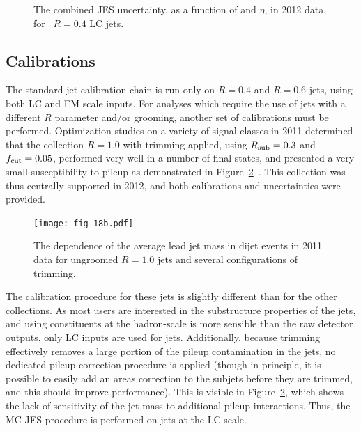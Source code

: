 
\begin{figure}
\centering
{}
\caption{The combined JES uncertainty, as a function of \pt and $\eta$, in 2012 data, for \antikt~$R=0.4$ LC jets.}
\label{fig:jet-reconstruction:combined_uncertainties}
\end{figure}



\subsection{\LargeR Calibrations}
\label{chapter:jet-reconstruction:larger}
The standard jet calibration chain is run only on $R=0.4$ and $R=0.6$ jets, using both LC and EM scale inputs. For analyses which require the use of jets with a different $R$ parameter and/or grooming, another set of calibrations must be performed. Optimization studies on a variety of signal classes in 2011 determined that the collection \antikt $R=1.0$ with trimming applied, using $R_{\rm sub} = 0.3$ and $f_{\rm cut} = 0.05$, performed very well in a number of final states, and presented a very small susceptibility to pileup as demonstrated in Figure~\ref{fig:jet-reconstruction:pileup_large}~\cite{ATLAS-SS-2011}. This collection was thus centrally supported in 2012, and both calibrations and uncertainties were provided.

\begin{figure}
\centering
\texttt{[image: fig\_18b.pdf]}
\caption{The dependence of the average lead jet mass in dijet events in 2011 data for ungroomed \antikt $R=1.0$ jets and several configurations of trimming.}
\label{fig:jet-reconstruction:pileup_large}
\end{figure}


The calibration procedure for these \largeR jets is slightly different than for the other collections. As most users are interested in the substructure properties of the jets, and using constituents at the hadron-scale is more sensible than the raw detector outputs, only LC inputs are used for \largeR jets. Additionally, because trimming effectively removes a large portion of the pileup contamination in the jets, no dedicated pileup correction procedure is applied (though in principle, it is possible to easily add an areas correction to the subjets before they are trimmed, and this should improve performance). This is visible in Figure~\ref{fig:jet-reconstruction:pileup_large}, which shows the lack of sensitivity of the jet mass to additional pileup interactions. Thus, the MC JES procedure is performed on jets at the LC scale.

